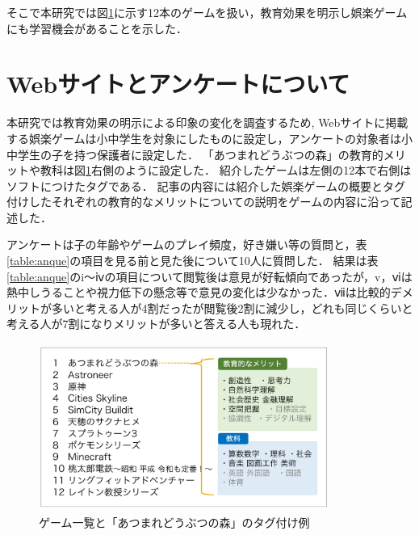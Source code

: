 \documentclass[twocolumn,10pt,a4j]{ltjsarticle}
\begin{document}
そこで本研究では図\ref{fig:ゲーム一覧}に示す12本のゲームを扱い，教育効果を明示し娯楽ゲームにも学習機会があることを示した．



\section{Webサイトとアンケートについて}
本研究では教育効果の明示による印象の変化を調査するため, Webサイトに掲載する娯楽ゲームは小中学生を対象にしたものに設定し，アンケートの対象者は小中学生の子を持つ保護者に設定した．
「あつまれどうぶつの森」の教育的メリットや教科は図\ref{fig:ゲーム一覧}右側のように設定した．
紹介したゲームは左側の12本で右側はソフトにつけたタグである．
記事の内容には紹介した娯楽ゲームの概要とタグ付けしたそれぞれの教育的なメリットについての説明をゲームの内容に沿って記述した．

アンケートは子の年齢やゲームのプレイ頻度，好き嫌い等の質問と，表\ref{table:anque}の項目を見る前と見た後について10人に質問した．
結果は表\ref{table:anque}のi～ⅳの項目について閲覧後は意見が好転傾向であったが，v，ⅵは熱中しうることや視力低下の懸念等で意見の変化は少なかった．ⅶは比較的デメリットが多いと考える人が4割だったが閲覧後2割に減少し，どれも同じくらいと考える人が7割になりメリットが多いと答える人も現れた．

\begin{figure}[h]
 \begin{center}
  \includegraphics[clip,width=95mm,height=55mm]{games.pdf}
 \end{center}
 \caption{ゲーム一覧と「あつまれどうぶつの森」のタグ付け例}
 \label{fig:ゲーム一覧}
\end{figure}
\end{document}
